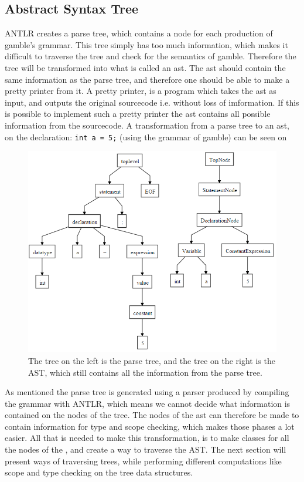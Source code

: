 \subsection*{Abstract Syntax Tree}
ANTLR creates a parse tree, which contains a node for each production of \gls{gamble}'s grammar.
This tree simply has too much information, which makes it difficult to traverse the tree and check for the semantics of \gls{gamble}.
Therefore the tree will be transformed into what is called an \acrfull{ast}.
The \acrfull{ast} should contain the same information as the parse tree, and therefore one should be able to make a pretty printer from it.
A pretty printer, is a program which takes the \acrfull{ast} as input, and outputs the original sourcecode i.e. without loss of imformation.
If this is possible to implement such a pretty printer the \acrfull{ast} contains all possible information from the sourcecode.
A transformation from a parse tree to an \acrfull{ast}, on the declaration: \texttt{int a = 5;} (using the grammar of \gls{gamble}) can be seen on 

\begin{figure}
		\centering
	 	\includegraphics[width=0.8\linewidth]{figures/Trees/AST.PNG}
		\caption{The tree on the left is the parse tree, and the tree on the right is the AST, which still contains all the information from the parse tree.} \label{image:AST}
\end{figure}

As mentioned the parse tree is generated using a parser produced by compiling the grammar with ANTLR, which means we cannot decide what information is contained on the nodes of the tree.
The nodes of the \acrfull{ast} can therefore be made to contain information for type and scope checking, which makes those phases a lot easier.
All that is needed to make this transformation, is to make classes for all the nodes of the , and create a way to traverse the AST.
The next section will present ways of traversing trees, while performing different computations like scope and type checking on the tree data structures.


